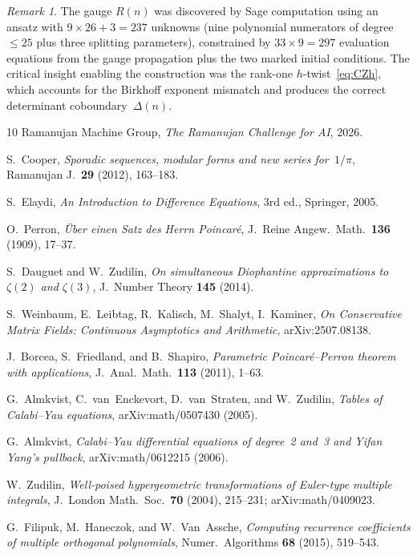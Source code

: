 \documentclass[11pt]{article}
\theoremstyle{remark}
\newtheorem*{remark}{Remark}
\begin{document}
\begin{remark}
The gauge $R(n)$ was discovered by Sage computation using an
ansatz with $9 \times 26 + 3 = 237$ unknowns (nine polynomial
numerators of degree~$\le 25$ plus three splitting parameters),
constrained by $33 \times 9 = 297$ evaluation equations from
the gauge propagation plus the two marked initial conditions.
The critical insight enabling the construction was the rank-one
$h$-twist~\eqref{eq:CZh}, which accounts for the Birkhoff
exponent mismatch and produces the correct determinant
coboundary~$\Delta(n)$.
\end{remark}

\begin{thebibliography}{10}
Ramanujan Machine Group,
\emph{The Ramanujan Challenge for AI}, 2026.

S.~Cooper,
\emph{Sporadic sequences, modular forms and new series
for~$1/\pi$},
Ramanujan J.\ \textbf{29} (2012), 163--183.

S.~Elaydi,
\emph{An Introduction to Difference Equations},
3rd ed., Springer, 2005.

O.~Perron,
\emph{\"Uber einen Satz des Herrn Poincar\'e},
J.\ Reine Angew.\ Math.\ \textbf{136} (1909), 17--37.

S.~Dauguet and W.~Zudilin,
\emph{On simultaneous Diophantine approximations to $\zeta(2)$
and $\zeta(3)$},
J.\ Number Theory \textbf{145} (2014).

S.~Weinbaum, E.~Leibtag, R.~Kalisch, M.~Shalyt, I.~Kaminer,
\emph{On Conservative Matrix Fields: Continuous Asymptotics and
Arithmetic}, arXiv:2507.08138.

J.~Borcea, S.~Friedland, and B.~Shapiro,
\emph{Parametric Poincar\'e--Perron theorem with applications},
J.\ Anal.\ Math.\ \textbf{113} (2011), 1--63.

G.~Almkvist, C.~van~Enckevort, D.~van~Straten, and W.~Zudilin,
\emph{Tables of Calabi--Yau equations},
arXiv:math/0507430 (2005).

G.~Almkvist,
\emph{Calabi--Yau differential equations of degree~2 and~3
and Yifan Yang's pullback},
arXiv:math/0612215 (2006).

W.~Zudilin,
\emph{Well-poised hypergeometric transformations of Euler-type
multiple integrals},
J.\ London Math.\ Soc.\ \textbf{70} (2004), 215--231;
arXiv:math/0409023.

G.~Filipuk, M.~Haneczok, and W.~Van~Assche,
\emph{Computing recurrence coefficients of multiple orthogonal
polynomials},
Numer.\ Algorithms \textbf{68} (2015), 519--543.
\end{thebibliography}
\end{document}
